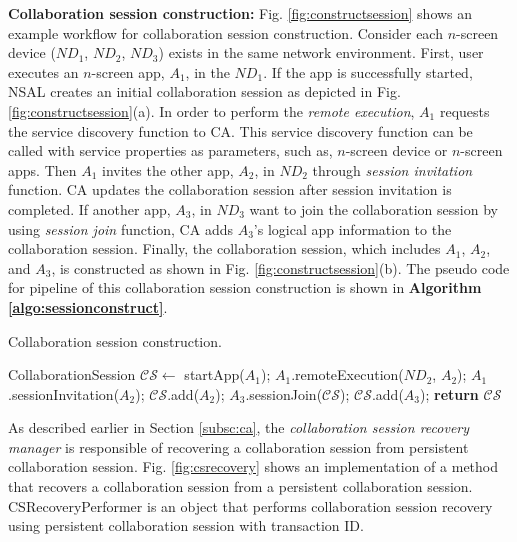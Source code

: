 \documentclass[conference]{IEEEtran}
\begin{document}
\noindent
\textbf{Collaboration session construction:}  Fig. \ref{fig:constructsession} shows an example workflow for collaboration session construction. Consider each $n$-screen device ($ND_1$, $ND_2$, $ND_3$)  exists in the same network environment. 
First, user executes an $n$-screen app, $A_1$, in the $ND_1$. If the app is successfully started, NSAL creates an initial collaboration session as depicted in Fig. \ref{fig:constructsession}(a). In order to perform the \textit{remote execution}, $A_1$ requests the service discovery function to CA.  This service discovery function can be called with service properties as parameters, such as, $n$-screen device or $n$-screen apps. Then $A_1$ invites the other app, $A_2$, in $ND_2$ through \textit{session invitation} function. CA updates the collaboration session after session invitation is completed. If another app, $A_3$, in $ND_3$ want to join the collaboration session by using \textit{session join} function, CA adds $A_3$'s logical app information to the collaboration session. Finally, the collaboration session, which includes $A_1$, $A_2$, and $A_3$, is constructed as shown in Fig. \ref{fig:constructsession}(b). 
The pseudo code for pipeline of this collaboration session construction is shown in \textbf{Algorithm \ref{algo:sessionconstruct}}.
    \begin{algorithm}
    \caption{Collaboration session construction.}
    \label{algo:sessionconstruct}
    \begin{algorithmic}[1]
       \State CollaborationSession $\mathcal{CS} \gets$ startApp($A_1$);
       \State $A_1$.remoteExecution($ND_2$, $A_2$);
       \State $A_1$.sessionInvitation($A_2$);
       \State $\mathcal{CS}$.add($A_2$);
       \State $A_3$.sessionJoin($\mathcal{CS}$);
       \State $\mathcal{CS}$.add($A_3$);
       \State \textbf{return} $\mathcal{CS}$
    \EndProcedure
    \end{algorithmic}
    \end{algorithm}
As described earlier in Section \ref{subsc:ca},  the \textit{collaboration session recovery manager} is responsible of recovering a collaboration session from persistent collaboration session.  Fig. \ref{fig:csrecovery} shows an implementation of a method that recovers a collaboration session from a persistent collaboration session. 
{\small \sffamily CSRecoveryPerformer} is an object that performs collaboration session recovery using persistent collaboration session with transaction ID.
\end{document}
